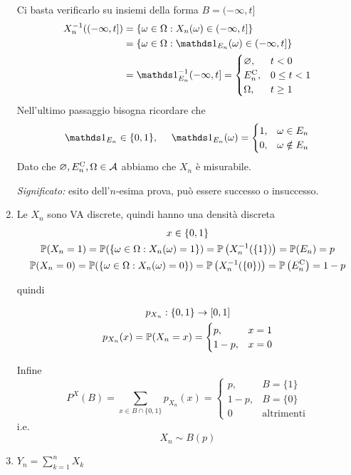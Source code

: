 \begin{enumerate}
Ci basta verificarlo su insiemi della forma $B=(-\infty ,t]$
\begin{align*}
X_{n}^{-1}((-\infty ,t]) & =\{\omega \in \Omega :X_{n}(\omega) \in (-\infty ,t]\}\\
 & =\{\omega \in \Omega :\Ind_{E_{n}}(\omega) \in (-\infty ,t]\}\\
 & =\Ind_{E_{n}}^{-1}(-\infty ,t] =
\begin{cases}
\emptyset , & t< 0\\
E_{n}\complementary , & 0\leq t< 1\\
\Omega , & t\geq 1
\end{cases}
\end{align*}
Nell'ultimo passaggio bisogna ricordare che
\begin{equation*}
\Ind_{E_{n}} \in \{0,1\} ,\ \ \ \ \Ind_{E_{n}}(\omega) =
\begin{cases}
1, & \omega \in E_{n}\\
0, & \omega \notin E_{n}
\end{cases}
\end{equation*}
Dato che $\varnothing ,E_{n}^{\mathrm{C}} ,\Omega \in \mathcal{A}$ abbiamo che $X_{n}$ è misurabile.

\textit{Significato:} esito dell'$n$-esima prova, può essere successo o insuccesso.
\item Le $X_{n}$ sono VA discrete, quindi hanno una densità discreta
\begin{gather*}
x\in \{0,1\}\\
\mathbb{P}(X_{n} =1) =\mathbb{P}(\{\omega \in \Omega :X_{n}(\omega) =1\}) =\mathbb{P}\left(X_{n}^{-1}(\{1\})\right) =\mathbb{P}(E_{n}) =p\\
\mathbb{P}(X_{n} =0) =\mathbb{P}(\{\omega \in \Omega :X_{n}(\omega) =0\}) =\mathbb{P}\left(X_{n}^{-1}(\{0\})\right) =\mathbb{P}\left(E_{n}^{\mathrm{C}}\right) =1-p
\end{gather*}

quindi

\begin{gather*}
p_{X_{n}} :\{0,1\}\rightarrow [0,1]\\
p_{X_{n}}(x) =\mathbb{P}(X_{n} =x) =
\begin{cases}
p, & x=1\\
1-p, & x=0
\end{cases}
\end{gather*}

Infine
\begin{equation*}
P^{X}(B) =\sum\limits_{x\in B\cap \{0,1\}} p_{X_{n}}(x) =
\begin{cases}
p, & B=\{1\}\\
1-p, & B=\{0\}\\
0 & \text{altrimenti}
\end{cases}
\end{equation*}
i.e.
\begin{equation*}
\boxed{X_{n} \sim B(p)}
\end{equation*}
\item $Y_{n} =\sum\limits_{k=1}^{n} X_{k}$


\end{enumerate}
